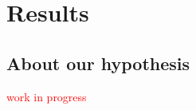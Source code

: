 \section{Results} \label{S:results}
%
\subsection{About our hypothesis} \label{sS:results_hypothesis}
%
\textcolor{red}{work in progress}

\begin{comment}
“simplest” model (E_NC2b) provides
(preliminar) evidence on,
the higher the unaided PTA the
lower the child’s SI (bP[2])
(based on power analysis, we can be
sure is a small effect)
no apparent statistical difference
between NH and HI=CI children
(but this requires a CONTRAST)
for each “hearing” year, the SI
increases in approx 0:40 logits
(effect larger than the assumed in
power analysis)


however, the “interaction” model
(E_NC5b3) shows similar results on,
the small (still non-significant)
effects of the unaided PTA on the
child’s SI
similar explained variability across
levels and blocks
(similar to the “simplest” model)
but “mild” evidence of prevalent
interactions,
SI means for HI=CI per E,
aEHS[2; 2] (Genetic) vs
aEHS[3; 2] (CMV)
different SI evolution for NH vs
HI=CI children, per unit A
(bAHS),

within the “interaction” model,
the size of the data within groups
from combinations of E and HS,
does not allow to reject the
contrasts’ null hypothesis,
similar result is observed on the
bAHS contrast
(because the effect is small, compared
to children’s variability)
but we still observe differences
between NH and HI/CI, and even
within HI/CI by E,
therefore we decide to keep the
(E_NC5b3) model
\end{comment}

\begin{comment}
It is important to highlight that for all model implementations, the visual inspection of trace, trace-rank and autocorrelation plots was performed. Additionally, we also evaluated the Gelman-Rubin diagnostic and effective number of samples \cite{Gelman_et_al_2014}. In all cases, the plots and statistics indicated the parameters achieved convergence, good mixing and lack of serial autocorrelation; all necessary requirements to be able to interpret the model estimates. 

Finally, considering the evidence provided by the previous step, we proceed to make inferences based on the selected models.
\end{comment}

